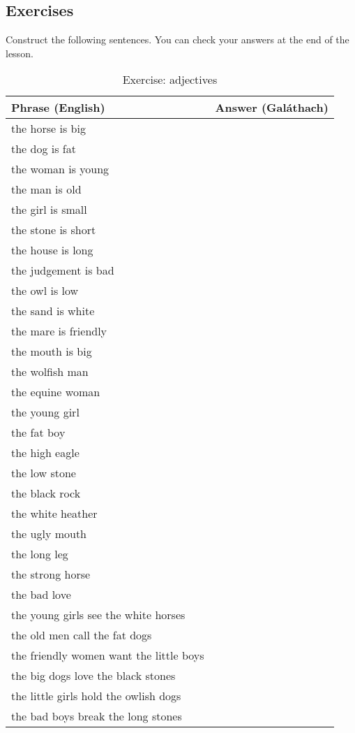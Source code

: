 \newpage
\subsection{Exercises}

Construct the following sentences. You can check your answers at the end of the lesson.
\begin{table}[H]
\centering
\begin{tabu}{|l|p{10.0cm}|}
  \toprule
  \textbf{Phrase (English)} & \textbf{Answer (Gal\'{a}thach)}\\
  \toprule
  the horse is big & \\
  \midrule
  the dog is fat & \\
  \midrule
  the woman is young & \\
  \midrule
  the man is old & \\
  \midrule
  the girl is small & \\
  \midrule
  the stone is short & \\
  \midrule
  the house is long & \\
  \midrule
  the judgement is bad & \\
  \midrule
  the owl is low & \\
  \midrule
  the sand is white & \\
  \midrule
  the mare is friendly & \\
  \midrule
  the mouth is big & \\
  \midrule
  the wolfish man & \\
  \midrule
  the equine woman & \\
  \midrule
  the young girl & \\
  \midrule
  the fat boy & \\
  \midrule
  the high eagle & \\
  \midrule
  the low stone & \\
  \midrule
  the black rock & \\
  \midrule
  the white heather & \\
  \midrule
  the ugly mouth & \\
  \midrule
  the long leg & \\
  \midrule
  the strong horse & \\
  \midrule
  the bad love & \\
  \midrule
  the young girls see the white horses & \\
  \midrule
  the old men call the fat dogs & \\
  \midrule
  the friendly women want the little boys & \\
  \midrule
  the big dogs love the black stones & \\
  \midrule
  the little girls hold the owlish dogs & \\
  \midrule
  the bad boys break the long stones & \\
  \bottomrule
\end{tabu}
\label{exercise_adjectives}
\caption{Exercise: adjectives}
\end{table}

